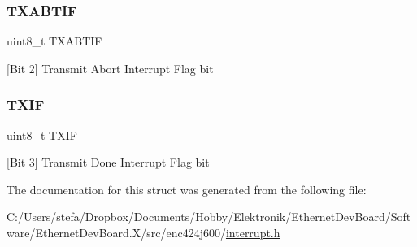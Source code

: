\subsubsection{\texorpdfstring{TXABTIF}{TXABTIF}}
{\footnotesize\ttfamily uint8\+\_\+t T\+X\+A\+B\+T\+IF}



\mbox{[}Bit 2\mbox{]} Transmit Abort Interrupt Flag bit 

\mbox{\label{structinterrupt_flags_a8ac6b64dff7b25ddf36cea5543329e56}} 
\subsubsection{\texorpdfstring{TXIF}{TXIF}}
{\footnotesize\ttfamily uint8\+\_\+t T\+X\+IF}



\mbox{[}Bit 3\mbox{]} Transmit Done Interrupt Flag bit 



The documentation for this struct was generated from the following file\+:\begin{DoxyCompactItemize}
\item 
C\+:/\+Users/stefa/\+Dropbox/\+Documents/\+Hobby/\+Elektronik/\+Ethernet\+Dev\+Board/\+Software/\+Ethernet\+Dev\+Board.\+X/src/enc424j600/\mbox{\hyperlink{interrupt_8h}{interrupt.\+h}}\end{DoxyCompactItemize}
